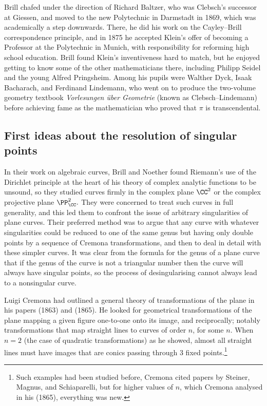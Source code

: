 Brill  chafed under the direction of  Richard Baltzer, who was Clebsch's successor at Giessen,  and moved to the new Polytechnic in Darmstadt in 1869, which was academically a step downwards. There, he did his work on the Cayley--Brill correspondence principle, and in 1875  he accepted Klein's offer of becoming a Professor at the Polytechnic in Munich, with responsibility for reforming high school education.  Brill found Klein's inventiveness hard to match, but he enjoyed getting to know some of the other mathematicians there, including Philipp Seidel and the young Alfred Pringsheim. Among his pupils were Walther Dyck, Isaak Bacharach, and Ferdinand Lindemann, who went on to produce the two-volume geometry textbook \emph{Vorlesungen \"uber Geometrie} (known as Clebsch--Lindemann) before achieving fame as the mathematician who proved that $\pi$ is transcendental.


\subsection{First ideas about the resolution of singular points}
In their work on algebraic curves, Brill and Noether found Riemann's use of the Dirichlet principle at the heart of his theory of complex analytic functions to be unsound, so they studied curves firmly in the complex plane $\CC^2$ or the complex projective plane $\PP_{\CC}^2.$ They were concerned to treat such curves in full generality, and this led them to confront the issue of arbitrary singularities of plane curves. Their preferred method was to argue that any curve with whatever singularities could be reduced to one of the same genus but having only double points by a sequence of Cremona transformations, and then to deal in detail with these simpler curves. It was clear from the formula for the genus of a plane curve that if the genus of the curve is not a triangular number then the curve will always have singular points, so the process of desingularising cannot always lead to a nonsingular curve.

Luigi Cremona had  outlined a general theory of transformations of the plane in his papers (1863) and (1865). He looked for geometrical transformations of the plane mapping a given figure one-to-one onto its image, and reciprocally; notably  transformations that map straight lines to curves of order $n$, for some $n.$ When $n=2$ (the case of quadratic transformations)  as he showed, almost all straight lines must have images that are conics passing through 3 fixed points.\footnote{Such examples had been studied before, Cremona  cited papers by Steiner, Magnus, and Schiaparelli, but for higher values of $n$, which Cremona analysed in his (1865), everything was new.}



